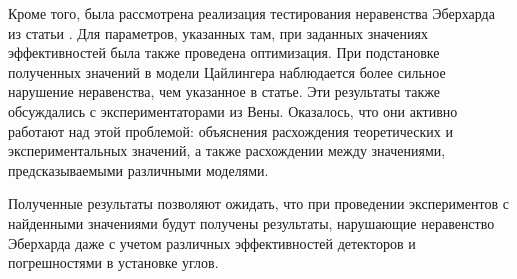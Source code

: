 \documentclass[%
master,         %
subf,           %
href,           %
colorlinks=true %
]{disser}
\numberwithin{equation}{section}
\numberwithin{figure}{section}
\begin{document}
Кроме того, была рассмотрена реализация тестирования неравенства Эберхарда из статьи \cite{Zeilinger}. Для параметров, указанных там, при заданных значениях эффективностей была также проведена оптимизация. При подстановке полученных значений в модели Цайлингера наблюдается более сильное нарушение неравенства, чем указанное в статье. Эти результаты также обсуждались с экспериментаторами из Вены. Оказалось, что они активно работают над этой проблемой: объяснения расхождения теоретических и экспериментальных значений, а также расхождении между значениями, предсказываемыми различными моделями.

Полученные результаты позволяют ожидать, что при проведении экспериментов с найденными значениями будут получены результаты, нарушающие неравенство Эберхарда даже с учетом различных эффективностей детекторов и погрешностями в установке углов.



\end{document}
